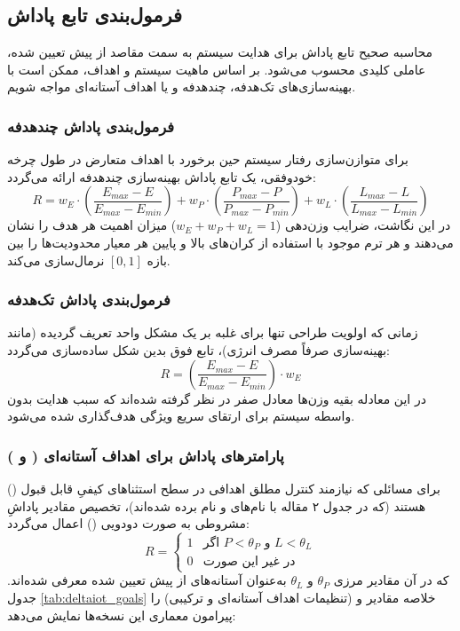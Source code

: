 \documentclass[oneside,openany,phd]{TMU-Thesis}
\begin{document}
\subsection{فرمول‌بندی تابع پاداش}

محاسبه صحیح تابع پاداش برای هدایت سیستم به سمت مقاصد از پیش تعیین شده، عاملی کلیدی محسوب می‌شود. بر اساس ماهیت سیستم و اهداف، ممکن است با بهینه‌سازی‌های تک‌هدفه، چندهدفه و یا اهداف آستانه‌ای مواجه شویم.

\subsubsection{فرمول‌بندی پاداش چندهدفه}

برای متوازن‌سازی رفتار سیستم حین برخورد با اهداف متعارض در طول چرخه خودوفقی، یک تابع پاداش بهینه‌سازی چندهدفه ارائه می‌گردد:
$$R = w_E \cdot \left(\frac{E_{max} - E}{E_{max} - E_{min}}\right) + w_P \cdot \left(\frac{P_{max} - P}{P_{max} - P_{min}}\right) + w_L \cdot \left(\frac{L_{max} - L}{L_{max} - L_{min}}\right)$$
در این نگاشت، ضرایب وزن‌دهی ($w_E + w_P + w_L = 1$) میزان اهمیت هر هدف را نشان می‌دهند و هر ترم موجود با استفاده از کران‌های بالا و پایین هر معیار محدودیت‌ها را بین بازه $[0, 1]$ نرمال‌سازی می‌کند.

\subsubsection{فرمول‌بندی پاداش تک‌هدفه}

زمانی که اولویت طراحی تنها برای غلبه بر یک مشکل واحد تعریف گردیده (مانند بهینه‌سازی صرفاً مصرف انرژی)، تابع فوق بدین شکل ساده‌سازی می‌گردد:
$$R = \left(\frac{E_{max} - E}{E_{max} - E_{min}}\right) \cdot w_E$$
در این معادله بقیه وزن‌ها معادل صفر در نظر گرفته شده‌اند که سبب هدایت بدون واسطه سیستم برای ارتقای سریع ویژگی هدف‌گذاری شده می‌شود.

\subsubsection{پارامترهای پاداش برای اهداف آستانه‌ای ( و )}

برای مسائلی که نیازمند کنترل مطلق اهدافی در سطح استثناهای کیفیِ قابل قبول () هستند (که در جدول ۲ مقاله با نام‌های  و  نام برده شده‌اند)، تخصیص مقادیر پاداشِ مشروطی به صورت دودویی () اعمال می‌گردد:
$$R = \begin{cases} 
1 & \text{اگر } P < \theta_P \text{ و } L < \theta_L \\
0 & \text{در غیر این صورت}
\end{cases}$$
که در آن مقادیر مرزی $\theta_P$ و $\theta_L$ به‌عنوان آستانه‌های از پیش تعیین شده معرفی شده‌اند. جدول \ref{tab:deltaiot_goals} خلاصه مقادیر  و  (تنظیمات اهداف آستانه‌ای و ترکیبی) را پیرامون معماری‌ این نسخه‌ها نمایش می‌دهد:
\end{document}
